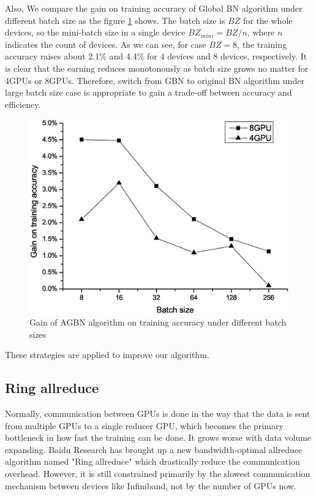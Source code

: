 Also, We compare the gain on training accuracy of Global BN algorithm under different batch size as the figure \ref{fig:accVsBz} shows. The batch size is $BZ$ for the whole devices, so the mini-batch size in a single device $BZ_{mini}=BZ/n$, where $n$ indicates the count of devices. 
As we can see, for case $BZ=8$, the training accuracy raises about 2.1$\%$ and 4.4$\%$ for 4 devices and 8 devices, respectively. It is clear that the earning reduces monotonously as batch size grows no matter for 4GPUs or 8GPUs. Therefore, switch from GBN to original BN algorithm under large batch size case is appropriate to gain a trade-off between accuracy and efficiency.



\begin{figure}[!hbp]
    \centering
    \includegraphics[width=0.8\linewidth]{figure/accVsBz.eps}
    \caption{Gain of AGBN algorithm on training accuracy under different batch sizes}
    \label{fig:accVsBz}
    \end{figure}

These strategies are applied to improve our algorithm.

\subsection{Ring allreduce}

Normally, communication between GPUs is done in the way that the data is sent from multiple GPUs to a single reducer GPU, which becomes the primary bottleneck in how fast the training can be done. It grows worse with data volume expanding. Baidu Research has brought up a new bandwidth-optimal allreduce algorithm named "Ring allreduce" which drastically reduce the communication overhead. However, it is still constrained primarily by the slowest communication mechanism between devices like Infiniband, not by the number of GPUs now.

